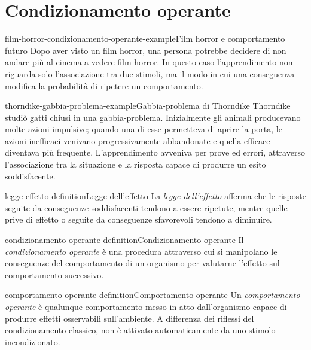 \documentclass[preview]{standalone}
\begin{document}
\genpage

\section{Condizionamento operante}

\begin{snippetexample}{film-horror-condizionamento-operante-example}{Film horror e comportamento futuro}
    Dopo aver visto un film horror, una persona potrebbe decidere di non andare
    più al cinema a vedere film horror. In questo caso l'apprendimento non
    riguarda solo l'associazione tra due stimoli, ma il modo in cui una
    conseguenza modifica la probabilità di ripetere un comportamento.
\end{snippetexample}

\begin{snippetexample}{thorndike-gabbia-problema-example}{Gabbia-problema di Thorndike}
    Thorndike studiò gatti chiusi in una gabbia-problema. Inizialmente gli
    animali producevano molte azioni impulsive; quando una di esse permetteva di
    aprire la porta, le azioni inefficaci venivano progressivamente abbandonate
    e quella efficace diventava più frequente. L'apprendimento avveniva per
    prove ed errori, attraverso l'associazione tra la situazione e la risposta
    capace di produrre un esito soddisfacente.
\end{snippetexample}


\begin{snippetdefinition}{legge-effetto-definition}{Legge dell'effetto}
    La \emph{legge dell'effetto} afferma che le risposte seguite da conseguenze
    soddisfacenti tendono a essere ripetute, mentre quelle prive di effetto o
    seguite da conseguenze sfavorevoli tendono a diminuire.
\end{snippetdefinition}

\begin{snippetdefinition}{condizionamento-operante-definition}{Condizionamento operante}
    Il \emph{condizionamento operante} è una procedura attraverso cui si
    manipolano le conseguenze del comportamento di un organismo per valutarne
    l'effetto sul comportamento successivo.
\end{snippetdefinition}

\begin{snippetdefinition}{comportamento-operante-definition}{Comportamento operante}
    Un \emph{comportamento operante} è qualunque comportamento messo in atto
    dall'organismo capace di produrre effetti osservabili sull'ambiente. A
    differenza dei riflessi del condizionamento classico, non è attivato
    automaticamente da uno stimolo incondizionato.
\end{snippetdefinition}
\end{document}
